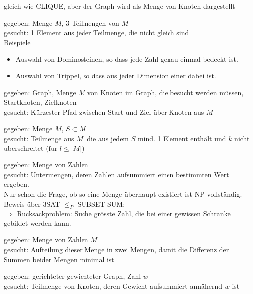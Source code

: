\documentclass[a4paper]{article}
\begin{document}
\begin{multicols}{2}
	\begin{fspec}	
	gleich wie CLIQUE, aber der Graph wird als  Menge von Knoten dargestellt
	\end{fspec}	
		
	\begin{fspec}[3D-Matching]	
	gegeben: Menge $M$, 3 Teilmengen von $M$ \\
	gesucht: 1 Element aus jeder Teilmenge, die nicht gleich sind \\
	Beispiele
	\begin{itemize}
		\item Auswahl von Dominosteinen, so dass jede Zahl genau einmal bedeckt ist.
		\item Auswahl von Trippel, so dass aus jeder Dimension einer dabei ist.
	\end{itemize}
	\end{fspec}	
	
	\begin{fspec}	
	gegeben: Graph, Menge $M$ von Knoten im Graph, die besucht werden müssen, Startknoten, Zielknoten \\
	gesucht: Kürzester Pfad zwischen Start und Ziel über Knoten aus $M$
	\end{fspec}	
	
	\begin{fspec}	
	gegeben: Menge $M$, $S \subset M$ \\
	gesucht: Teilmenge aus $M$, die aus jedem $S$ mind. 1 Element enthält und $k$ nicht überschreitet (für $l \leq |M|$)
	\end{fspec}	
	
	\begin{fspec}
	gegeben: Menge von Zahlen \\
	gesucht: Untermengen, deren Zahlen aufsummiert einen bestimmten Wert ergeben. \\
	Nur schon die Frage, ob so eine Menge überhaupt existiert ist NP-vollständig. \\
	Beweis über 3SAT $\leq_P$ SUBSET-SUM: \\
	$\Rightarrow$ Rucksackproblem: Suche grösste Zahl, die bei einer gewissen Schranke gebildet werden kann.
	\end{fspec}	
	
	\begin{fspec}[Partition]	
	gegeben: Menge von Zahlen $M$\\
	gesucht: Aufteilung dieser Menge in zwei Mengen, damit die Differenz der Summen beider Mengen minimal ist
	\end{fspec}	
		
	\begin{fspec}	
	gegeben: gerichteter gewichteter Graph, Zahl $w$ \\
	gesucht: Teilmenge von Knoten, deren Gewicht aufsummiert annähernd $w$ ist
	\end{fspec}	
	
	\end{multicols}
\end{document}
